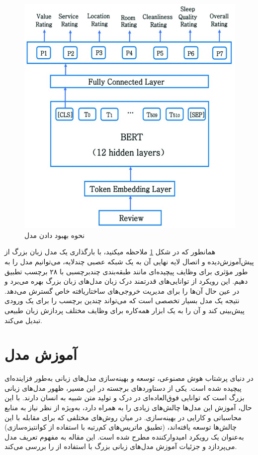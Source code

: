 \begin{figure}[H]
	\centering
	\includegraphics[width=1\textwidth]{figures/finetune.png}
	\caption{نحوه بهبود دادن مدل}
	\label{fig:finetune}
\end{figure}

همانطور که در شکل \ref{fig:finetune} ملاحظه میکنید،
با بارگذاری یک مدل زبان بزرگ از پیش‌آموزش‌دیده و اتصال لایه نهایی آن به یک شبکه عصبی چندلایه، می‌توانیم مدل را به طور مؤثری برای وظایف پیچیده‌ای مانند طبقه‌بندی چند‌برچسبی با ۲۸ برچسب تطبیق دهیم. این رویکرد از توانایی‌های قدرتمند درک زبان مدل‌های زبان بزرگ بهره می‌برد و در عین حال آن‌ها را برای مدیریت خروجی‌های ساختاریافته خاص گسترش می‌دهد. نتیجه یک مدل بسیار تخصصی است که می‌تواند چندین برچسب را برای یک ورودی پیش‌بینی کند و آن را به یک ابزار همه‌کاره برای وظایف مختلف پردازش زبان طبیعی تبدیل می‌کند.

\section{آموزش مدل}

در دنیای پرشتاب هوش مصنوعی، توسعه و بهینه‌سازی مدل‌های زبانی به‌طور فزاینده‌ای پیچیده شده است. یکی از دستاوردهای برجسته در این مسیر، ظهور مدل‌های زبانی بزرگ  است که توانایی فوق‌العاده‌ای در درک و تولید متن شبیه به انسان دارند. با این حال، آموزش این مدل‌ها چالش‌های زیادی را به همراه دارد، به‌ویژه از نظر نیاز به منابع محاسباتی و کارایی در بهینه‌سازی. در میان روش‌های مختلفی که برای مقابله با این چالش‌ها توسعه یافته‌اند، (تطبیق ماتریس‌های کم‌رتبه با استفاده از کوانتیزه‌سازی) به‌عنوان یک رویکرد امیدوارکننده مطرح شده است. این مقاله به مفهوم تعریف مدل می‌پردازد و جزئیات آموزش مدل‌های زبانی بزرگ با استفاده از  را بررسی می‌کند.

